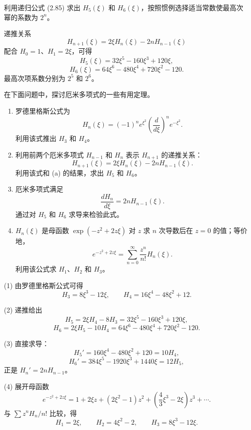 \begin{question}
利用递归公式 (2.85) 求出 $H_5(\xi)$ 和 $H_6(\xi)$，按照惯例选择适当常数使最高次幂的系数为 $2^n$。

\par\smallskip
{}

\end{question}
\begin{solution}
递推关系
\[
H_{n+1}(\xi)=2\xi H_n(\xi)-2nH_{n-1}(\xi)
\]
配合 $H_0=1$、$H_1=2\xi$，可得
\[
H_5(\xi)=32\xi^5-160\xi^3+120\xi,
\]
\[
H_6(\xi)=64\xi^6-480\xi^4+720\xi^2-120.
\]
最高次项系数分别为 $2^5$ 和 $2^6$。
\end{solution}

\begin{question}
在下面问题中，探讨厄米多项式的一些有用定理。
\begin{enumerate}
\item 罗德里格斯公式为
\[
H_n(\xi)=(-1)^n e^{\xi^2}\left(\frac{d}{d\xi}\right)^n e^{-\xi^2} .
\]
利用该式推出 $H_3$ 和 $H_4$。
\item 利用前两个厄米多项式 $H_{n-1}$ 和 $H_n$ 表示 $H_{n+1}$ 的递推关系：
\[
H_{n+1}(\xi)=2\xi H_n(\xi)-2nH_{n-1}(\xi).
\]
利用该式和 (a) 的结果，求出 $H_5$ 和 $H_6$。
\item 厄米多项式满足
\[
\frac{dH_n}{d\xi}=2nH_{n-1}(\xi).
\]
通过对 $H_5$ 和 $H_6$ 求导来检验此式。
\item $H_n(\xi)$ 是母函数 $\exp(-z^2+2z\xi)$ 对 $z$ 求 $n$ 次导数后在 $z=0$ 的值；等价地，
\[
e^{-z^2+2z\xi}=\sum_{n=0}^{\infty}\frac{z^n}{n!}H_n(\xi).
\]
利用该公式求 $H_1$、$H_2$ 和 $H_3$。
\end{enumerate}
\end{question}
\begin{solution}
(1) 由罗德里格斯公式可得
\[
H_3=8\xi^3-12\xi,
\qquad
H_4=16\xi^4-48\xi^2+12.
\]

(2) 递推给出
\[
H_5=2\xi H_4-8H_3=32\xi^5-160\xi^3+120\xi,
\]
\[
H_6=2\xi H_5-10H_4=64\xi^6-480\xi^4+720\xi^2-120.
\]

(3) 直接求导：
\[
H_5'=160\xi^4-480\xi^2+120=10H_4,
\]
\[
H_6'=384\xi^5-1920\xi^3+1440\xi=12H_5,
\]
正是 $H_n'=2nH_{n-1}$。

(4) 展开母函数
\[
e^{-z^2+2z\xi}=1+2\xi z+(2\xi^2-1)z^2+\left(\frac43\xi^3-2\xi\right)z^3+\cdots.
\]
与 $\sum z^nH_n/n!$ 比较，得
\[
H_1=2\xi,
\qquad H_2=4\xi^2-2,
\qquad H_3=8\xi^3-12\xi.
\]
\end{solution}

